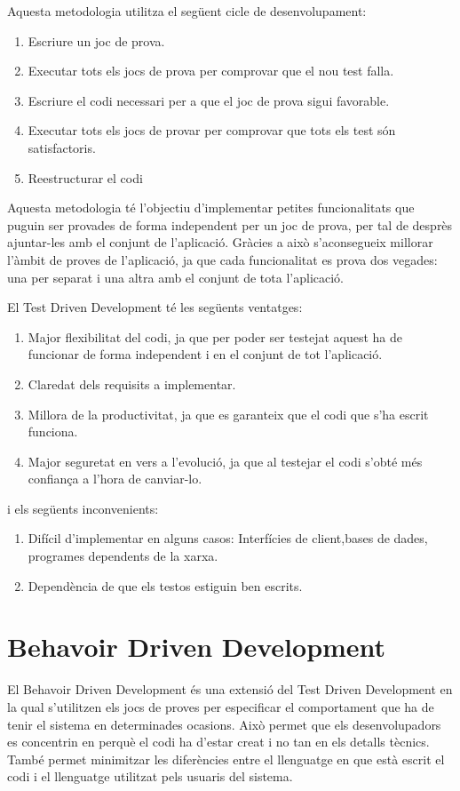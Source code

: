 \newpage

Aquesta metodologia utilitza el següent cicle de desenvolupament: 

\begin{enumerate}
    \item{Escriure un joc de prova.}
    \item{Executar tots els jocs de prova per comprovar que el nou test falla.}
    \item{Escriure el codi necessari per a que el joc de prova sigui favorable.}
    \item{Executar tots els jocs de provar per comprovar que tots els test són satisfactoris.}
    \item{Reestructurar el codi}
\end{enumerate}

Aquesta metodologia té l'objectiu d'implementar petites funcionalitats que puguin ser provades de forma independent per un joc de prova, per tal de desprès ajuntar-les amb el conjunt de l'aplicació. Gràcies a això s'aconsegueix millorar l'àmbit de proves de l'aplicació, ja que cada funcionalitat es prova dos vegades: una per separat i una altra amb el conjunt de tota l'aplicació.  

El Test Driven Development té les següents ventatges: 

\begin{enumerate}
    \item{Major flexibilitat del codi, ja que per poder ser testejat aquest ha de funcionar de forma independent i en el conjunt de tot l'aplicació.}
    \item{Claredat dels requisits a implementar.}
    \item{Millora de la productivitat, ja que es garanteix que el codi que s'ha escrit funciona.}
    \item{Major seguretat en vers a l'evolució, ja que al testejar el codi s'obté més confiança a l'hora de canviar-lo.}
\end{enumerate}

i els següents inconvenients: 

\begin{enumerate}
    \item{Difícil d'implementar en alguns casos: Interfícies de client,bases de dades, programes dependents de la xarxa.}
    \item{Dependència de que els testos estiguin ben escrits. }
\end{enumerate}

\section{Behavoir Driven Development}
\label{sec:bdd}

El Behavoir Driven Development és una extensió del Test Driven Development en la qual s'utilitzen els jocs de proves per 
especificar el comportament que ha de tenir el sistema en determinades ocasions. Això permet que els desenvolupadors es concentrin en perquè el codi ha d'estar creat i no tan en els detalls tècnics. També permet minimitzar les diferències entre el llenguatge en que està escrit el codi i el llenguatge utilitzat pels usuaris del sistema. 

